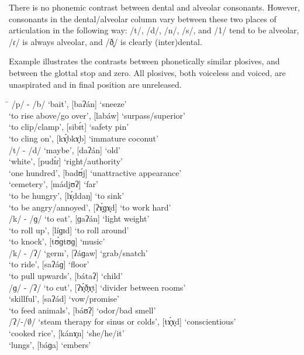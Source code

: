 There is no phonemic contrast between dental and alveolar consonants. However, consonants in the dental/alveolar column vary between these two places of articulation in the following way: /t/, /d/, /n/, /s/, and /1/ tend to be alveolar, /ɾ/ is always alveolar, and /ð̞/ is clearly (inter)dental.

 Example  illustrates the contrasts between phonetically similar plosives, and between the glottal stop and zero. All plosives, both voiceless and voiced, are unaspirated and in final position are unreleased.
\ea
\label{ex:sneeze}
\begin{tabbing}
\hspace{1.2cm} \= \kill
/p/ - /b/ \> [paʔán] ‘bait’, [baʔán] ‘sneeze’ \\
\> [lápaw] ‘to rise above/go over’, [labáw] ‘surpass/superior’ \\
\> [sipɪ́t] ‘to clip/clamp’, [sibɪ́t] ‘safety pin’ \\
\> [kɤ̞́pkɤ̞p] ‘to cling on’, [kɤ̞́bkɤ̞b] ‘immature coconut’ \\
/t/ - /d/ \> [taʔán] ‘maybe’, [daʔán] ‘old’ \\
\>   [putɪ́ʔ] ‘white’, [pudɪ́ɾ] ‘right/authority’ \\
\>   [ɡatʊ́s] ‘one hundred’, [badʊ́j] ‘unattractive appearance’ \\
\>   [pátjʊ] ‘cemetery’, [mádjʊʔ] ‘far’ \\
\>   [ð̞ɤ̞́ttɤ̞m] ‘to be hungry’, [lɤ̞́ddaŋ] ‘to sink’ \\
\>   [ʔɤ̞́ɡɤ̞t] ‘to be angry/annoyed’, [ʔɤ̞́ɡɤ̞d] ‘to work hard’ \\
/k/ - /ɡ/ \> [kaʔán] ‘to eat’, [ɡaʔán] ‘light weight’ \\
\>   [líkɪd] ‘to roll up’, [líɡɪd] ‘to roll around’ \\
\>   [tʊ́ktʊk] ‘to knock’, [tʊ́ɡtʊɡ] ‘music’ \\
/k/ - /ʔ/ \> [káɡaw] ‘germ’, [ʔáɡaw] ‘grab/snatch’ \\
\>   [sakáj] ‘to ride’, [saʔáɡ] ‘floor’ \\
\>   [bátak] ‘to pull upwards’, [bátaʔ] ‘child’ \\
/ɡ/ - /ʔ/ \> [ɡɤ̞́ð̞ɤ̞t] ‘to cut’, [ʔɤ̞́ð̞ɤ̞t] ‘divider between rooms’ \\
\>   [saɡád] ‘skillful’, [saʔád] ‘vow/promise’ \\
\>   [báʊɡ] ‘to feed animals’, [báʊʔ] ‘odor/bad smell’ \\
/ʔ/-/${\emptyset}$/ \> [tɤ̞́ʔɤ̞b]‘steam therapy for sinus or colds’, [tɤ̞́ɤ̞d] ‘conscientious’ \\
\>    [kánʔɤ̞n] ‘cooked rice’, [kánɤ̞n] ‘she/he/it’ \\
\>   [báɡaʔ] ‘lungs’, [báɡa] ‘embers’
\end{tabbing}
\z

